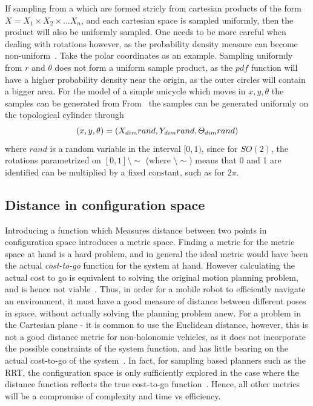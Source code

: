 If sampling from a \modelconfigurationspace{} which are formed stricly from
cartesian products of the form \(X = X_1\times X_2\times \ldots X_n\), and each
cartesian space is sampled uniformly, then the product will also be uniformly
sampled. One needs to be more careful when dealing with rotations however, as
the probability density measure can become non-uniform~\cite{Lav06}. Take the
polar coordinates as an example. Sampling uniformly from \(r\) and \(\theta\)
does not form a uniform sample product, as the \(pdf\) function will have a
higher probability density near the origin, as the outer circles will contain a
bigger area. For the model of a simple unicycle which moves in \(x,y,\theta\)
the samples can be generated from
From~\cite{kuffnerEffectiveSamplingDistance2004} the samples can be generated
uniformly on the topological cylinder through
\[
  (x,y,\theta) = (\mathnormal{X}_{dim}rand, \mathnormal{Y}_{dim}rand, \mathnormal{\Theta}_{dim}rand)
\]
where \(rand\) is a random variable in the interval \([0,1)\), since for
\(SO(2)\), the rotations parametrized on \([0,1]\setminus\sim\) (where
\(\setminus\sim\)) means that 0 and 1 are identified can be multiplied by a
fixed constant, such as for \(2\pi\).

\subsection{Distance in configuration space}

Introducing a function which Measures distance between two points in
configuration space introduces a metric space. Finding a metric for the metric
space at hand is a hard problem, and in general the ideal metric would have been
the actual \textit{cost-to-go} function for the system at hand. However
calculating the actual cost to go is equivalent to solving the original motion
planning problem, and is hence not
viable~\cite{pengchengReducingMetricSensitivity2001}. Thus, in order for a
mobile robot to efficiently navigate an environment, it must have a good measure
of distance between different poses in space, without actually solving the
planning problem anew. For a problem in the Cartesian plane - it is common to
use the Euclidean distance, however, this is not a good distance metric for
non-holonomic vehicles, as it does not incorporate the possible constraints of
the system function, and has little bearing on the actual cost-to-go of the
system~\cite{parkFeedbackMotionPlanning2015}. In fact, for sampling based
planners such as the \ac{RRT}, the configuration space is only sufficiently
explored in the case where the distance function reflects the true cost-to-go
function~\cite{pengchengReducingMetricSensitivity2001}. Hence, all other metrics
will be a compromise of complexity and time vs efficiency.

